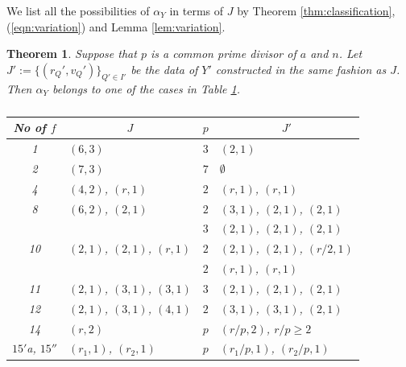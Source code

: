 \documentclass[a4paper,11pt]{amsart}
\newtheorem{theorem}{Theorem}[section]
\theoremstyle{definition}
\theoremstyle{remark}
\numberwithin{equation}{section}
\begin{document}
We list all the possibilities of $\alpha_Y$ in terms of $J$
by Theorem \ref{thm:classification}, (\ref{eqn:variation})
and Lemma \ref{lem:variation}.

\begin{theorem}\label{thm:ramification}
Suppose that $p$ is a common prime divisor of $a$ and $n$.
Let $J':=\{(r_Q',v_Q')\}_{Q'\in I'}$ be the data of $Y'$ constructed
in the same fashion as $J$.
Then $\alpha_Y$ belongs to one of the cases
in Table \textup{\ref{tbl:ramification}}.

\begin{table}[ht]
\caption{}\label{tbl:ramification}
\begin{tabular}{c|l|c|l}
\hline
\textup{No of $f$}
&\multicolumn{1}{c|}{$J$}    & $p$ & \multicolumn{1}{c}{$J'$}    \\
\hline
\textup{1}  & $(6,3)$                             &
$3$ & $(2,1)$                              \\
\textup{2}  & $(7,3)$                             &
$7$ & $\emptyset$                          \\
\textup{4}  & \textup{$(4,2)$, $(r,1)$}           &
$2$ & \textup{$(r,1)$, $(r,1)$}            \\
\textup{8}  & \textup{$(6,2)$, $(2,1)$}           &
$2$ & \textup{$(3,1)$, $(2,1)$, $(2,1)$}   \\
            &                                     &
$3$ & \textup{$(2,1)$, $(2,1)$, $(2,1)$}   \\
\textup{10} & \textup{$(2,1)$, $(2,1)$, $(r,1)$}  &
$2$ & \textup{$(2,1)$, $(2,1)$, $(r/2,1)$} \\
            &                                     &
$2$ & \textup{$(r,1)$, $(r,1)$}            \\
\textup{11} & \textup{$(2,1)$, $(3,1)$, $(3,1)$}  &
$3$ & \textup{$(2,1)$, $(2,1)$, $(2,1)$}   \\
\textup{12} & \textup{$(2,1)$, $(3,1)$, $(4,1)$}  &
$2$ & \textup{$(3,1)$, $(3,1)$, $(2,1)$}   \\
\textup{14} & \textup{$(r,2)$}                    &
$p$ & \textup{$(r/p,2)$, $r/p \ge 2$}      \\
\textup{$\textrm{15}'$a, $\textrm{15}''$} & \textup{$(r_1,1)$, $(r_2,1)$} &
$p$ & \textup{$(r_1/p,1)$, $(r_2/p,1)$}    \\
\hline
\end{tabular}
\end{table}
\end{theorem}
\end{document}
